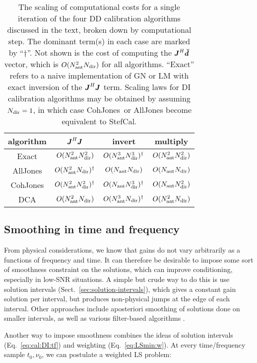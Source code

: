 \documentclass[useAMS,usenatbib]{mn2e}
\newcommand{\mat}[1]{{\bmath{#1}}}
\newcommand{\JJ}{\mat{J}} %
\newcommand{\JHJ}{\JJ^H\JJ} %
\newcommand{\COH}{{\sc CohJones}}
\newcommand{\StefCal}{{\sc StefCal}}
\begin{document}
\begin{table}
\begin{tabular}{c|ccc}
algorithm & $\JHJ$ & invert & multiply \\
\hline
Exact          & $O(N_\mathrm{ant}^2N_\mathrm{dir}^2)$ & $O(N_\mathrm{ant}^3N_\mathrm{dir}^3)^\dagger$ &  $O(N_\mathrm{ant}^2N_\mathrm{dir}^2)$ \\ 
{\sc AllJones} & $O(N_\mathrm{ant}^2N_\mathrm{dir})^\dagger$   & $O(N_\mathrm{ant}N_\mathrm{dir})$     &  $O(N_\mathrm{ant}N_\mathrm{dir})$ \\
\COH           & $O(N_\mathrm{ant}^2N_\mathrm{dir}^2)^\dagger$ & $O(N_\mathrm{ant}N_\mathrm{dir}^3)^\dagger$   &  $O(N_\mathrm{ant}N_\mathrm{dir}^2)$ \\
DCA            & $O(N_\mathrm{ant}^2N_\mathrm{dir})$   & $O(N_\mathrm{ant}^3N_\mathrm{dir})^\dagger$   &  $O(N_\mathrm{ant}^2N_\mathrm{dir})$ \\
\hline
\end{tabular}
\caption{\label{tab:costs}The scaling of computational costs for a single iteration of the 
four DD calibration algorithms discussed in the text, broken down by computational step. 
The dominant term(s) in each case are marked by ``$\dagger$''. Not shown is the cost of computing the $\JJ^H\Dd$ 
vector, which is $O(N_\mathrm{ant}^2N_\mathrm{dir})$ for all algorithms. ``Exact'' refers to a naive implementation of GN or LM with exact 
inversion of the $\JHJ$ term. Scaling laws for DI calibration algorithms may be obtained by assuming $N_\mathrm{dir}=1$, in which
case \COH\ or {\sc AllJones} become equivalent to \StefCal. 
}
\end{table}

\subsection{Smoothing in time and frequency}
\label{sec:DI:smooth}

From physical considerations, we know that gains do not vary arbitrarily as a functions of frequency and time. It can
therefore be desirable to impose some sort of smoothness constraint on the solutions, which can improve conditioning, especially
in low-SNR situations. A simple but crude way to do this is use solution intervals (Sect.~\ref{sec:solution-intervals}),
which gives a constant gain solution per interval, but produces non-physical jumps at the edge of each interval.
Other approaches include aposteriori smoothing of solutions done on smaller intervals, as well as various filter-based 
algorithms \citep{tasse-filters}. 

Another way to impose smoothness combines the ideas of solution intervals  (Eq.~\ref{eq:cal:DI:tf}) 
and weighting (Eq.~\ref{eq:LSmin:w}). At every time/frequency sample $t_0,\nu_0$, we can postulate a weighted 
LS problem:
\end{document}
